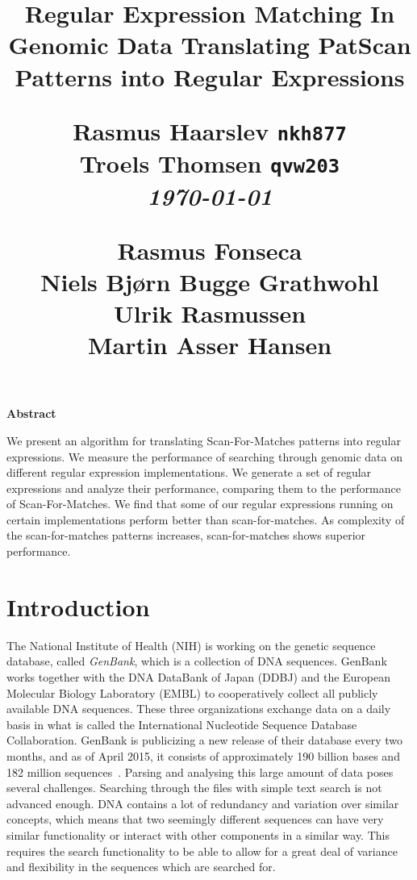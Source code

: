 \documentclass[12pt]{article}
\title{
  \vspace{4cm}
  \begin{flushleft}
  \Large{\textbf{Regular Expression Matching In Genomic Data}}
  \vspace{1cm}
  \large{Translating PatScan Patterns into Regular Expressions}
  \end{flushleft}
  \normalsize
  Rasmus Haarslev \texttt{nkh877} \\
  Troels Thomsen \texttt{qvw203} \\
  \textit{\small \today}
  \begin{flushleft}
  \vspace{10cm}
  \small
  {Rasmus Fonseca\\
   Niels Bjørn Bugge Grathwohl\\
   Ulrik Rasmussen\\
   Martin Asser Hansen}
  \end{flushleft}
}
\date{
}
\theoremstyle{definition}
\def \ColourPDF {include/ku-farve}
\def \TitlePDF {include/nat-en}  %
\begin{document}

\clearpage
{}
\thispagestyle{empty}
\maketitle

\newpage

\begin{center}
\textbf{Abstract}
\end{center}

\vspace{0.5cm}

We present an algorithm for translating Scan-For-Matches patterns into regular expressions. We measure the performance of searching through genomic data on different regular expression implementations. We generate a set of regular expressions and analyze their performance, comparing them to the performance of Scan-For-Matches. We find that some of our regular expressions running on certain implementations perform better than scan-for-matches. As complexity of the scan-for-matches patterns increases, scan-for-matches shows superior performance.

\newpage

\tableofcontents
\newpage

\pagestyle{fancy}
\fancyhf{}
\rhead{\today}
\cfoot{\thepage}


\section{Introduction}

The National Institute of Health (NIH) is working on the genetic sequence database, called \emph{GenBank}, which is a collection of DNA sequences. GenBank works together with the DNA DataBank of Japan (DDBJ) and the European Molecular Biology Laboratory (EMBL) to cooperatively collect all publicly available DNA sequences. These three organizations exchange data on a daily basis in what is called the International Nucleotide Sequence Database Collaboration. GenBank is publicizing a new release of their database every two months, and as of April 2015, it consists of approximately 190 billion bases and 182 million sequences~\cite{GenBank}. Parsing and analysing this large amount of data poses several challenges. Searching through the files with simple text search is not advanced enough. DNA contains a lot of redundancy and variation over similar concepts, which means that two seemingly different sequences can have very similar functionality or interact with other components in a similar way. This requires the search functionality to be able to allow for a great deal of variance and flexibility in the sequences which are searched for.
\end{document}
